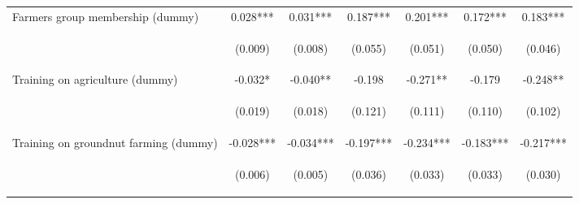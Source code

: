 \begin{center}
\begin{tabular}{lcccccc}
Farmers group membership (dummy) & 0.028*** & 0.031*** & 0.187*** & 0.201*** & 0.172*** & 0.183*** \\
\vspace{4pt} & \begin{footnotesize}(0.009)\end{footnotesize} & \begin{footnotesize}(0.008)\end{footnotesize} & \begin{footnotesize}(0.055)\end{footnotesize} & \begin{footnotesize}(0.051)\end{footnotesize} & \begin{footnotesize}(0.050)\end{footnotesize} & \begin{footnotesize}(0.046)\end{footnotesize} \\
Training on agriculture (dummy) & -0.032* & -0.040** & -0.198 & -0.271** & -0.179 & -0.248** \\
\vspace{4pt} & \begin{footnotesize}(0.019)\end{footnotesize} & \begin{footnotesize}(0.018)\end{footnotesize} & \begin{footnotesize}(0.121)\end{footnotesize} & \begin{footnotesize}(0.111)\end{footnotesize} & \begin{footnotesize}(0.110)\end{footnotesize} & \begin{footnotesize}(0.102)\end{footnotesize} \\
Training on groundnut farming (dummy) & -0.028*** & -0.034*** & -0.197*** & -0.234*** & -0.183*** & -0.217*** \\
\vspace{4pt} & \begin{footnotesize}(0.006)\end{footnotesize} & \begin{footnotesize}(0.005)\end{footnotesize} & \begin{footnotesize}(0.036)\end{footnotesize} & \begin{footnotesize}(0.033)\end{footnotesize} & \begin{footnotesize}(0.033)\end{footnotesize} & \begin{footnotesize}(0.030)\end{footnotesize} \\

\end{tabular}
\end{center}
